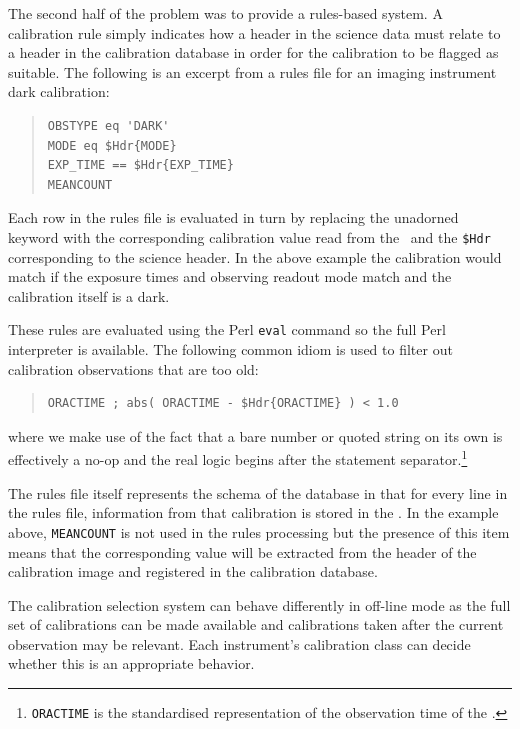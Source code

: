 \documentclass[final,authoryear,5p,times,twocolumn]{elsarticle}
\begin{document}
The second half of the problem was to provide a rules-based system.
A calibration rule simply indicates how a header in the science data
must relate to a header in the calibration database in order for the
calibration to be flagged as suitable. The following is an excerpt
from a rules file for an imaging instrument dark calibration:

\begin{quote}
{\small
\begin{verbatim}
OBSTYPE eq 'DARK'
MODE eq $Hdr{MODE}
EXP_TIME == $Hdr{EXP_TIME}
MEANCOUNT
\end{verbatim}
}
\end{quote}

Each row in the rules file is evaluated in turn by replacing the
unadorned keyword with the corresponding calibration value read from
the \Index\ and the \texttt{\$Hdr} corresponding to the science
header. In the above example the
calibration would match if the exposure times and observing readout
mode match and the calibration itself is a dark.

These rules are evaluated using the Perl \texttt{eval} command
so the full Perl interpreter is available. The following common idiom
is used to filter out calibration observations that are too old:

\begin{quote}
{\small
\begin{verbatim}
ORACTIME ; abs( ORACTIME - $Hdr{ORACTIME} ) < 1.0
\end{verbatim}
}
\end{quote}

where we make use of the fact that a bare number or quoted string on
its own is effectively a no-op and the real logic begins after the
statement separator.\footnote{\texttt{ORACTIME} is the standardised
representation of the observation time of the \Frame.}

The rules file itself represents the schema of the database in
that for every line in the rules file, information from that
calibration is stored in the \Index. In the example above,
\texttt{MEANCOUNT} is not used in the rules processing but the
presence of this item means that the corresponding value will be
extracted from the header of the calibration image and registered in
the calibration database.

The calibration selection system can behave differently in off-line
mode as the full set of calibrations can be made available and
calibrations taken after the current observation may be relevant. Each
instrument's calibration class can decide whether this is an
appropriate behavior.
\end{document}
